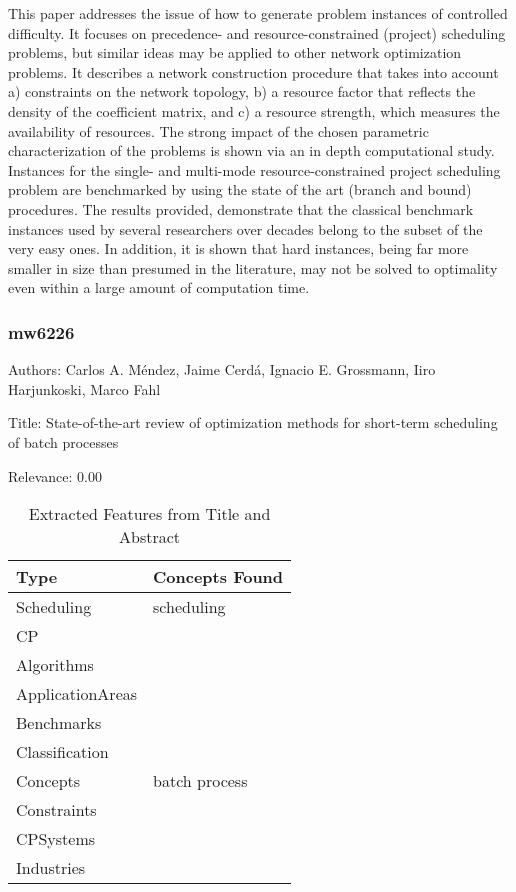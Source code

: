   This paper addresses the issue of how to generate problem instances of controlled difficulty. It focuses on precedence- and resource-constrained (project) scheduling problems, but similar ideas may be applied to other network optimization problems. It describes a network construction procedure that takes into account a) constraints on the network topology, b) a resource factor that reflects the density of the coefficient matrix, and c) a resource strength, which measures the availability of resources. The strong impact of the chosen parametric characterization of the problems is shown via an in depth computational study. Instances for the single- and multi-mode resource-constrained project scheduling problem are benchmarked by using the state of the art (branch and bound) procedures. The results provided, demonstrate that the classical benchmark instances used by several researchers over decades belong to the subset of the very easy ones. In addition, it is shown that hard instances, being far more smaller in size than presumed in the literature, may not be solved to optimality even within a large amount of computation time.  

\subsubsection{mw6226}
\label{mw:mw6226}

Authors: Carlos A. Méndez, Jaime Cerdá, Ignacio E. Grossmann, Iiro Harjunkoski, Marco Fahl

Title: State-of-the-art review of optimization methods for short-term scheduling of batch processes

Relevance:  0.00

{\scriptsize
\begin{longtable}{p{2cm}p{20cm}}
\caption{Extracted Features from Title and Abstract}\\ \toprule
Type & Concepts Found\\ \midrule
\endhead
\bottomrule
\endfoot
Scheduling & scheduling\\ 
CP & \\ 
Algorithms & \\ 
ApplicationAreas & \\ 
Benchmarks & \\ 
Classification & \\ 
Concepts & batch process\\ 
Constraints & \\ 
CPSystems & \\ 
Industries & \\ 
\end{longtable}
}



